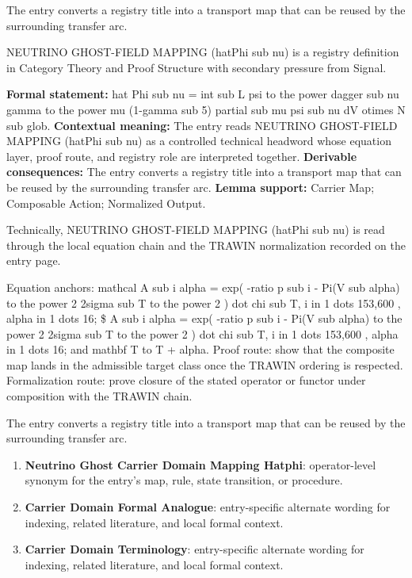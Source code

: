 The entry converts a registry title into a transport map that can be reused by the surrounding transfer arc.
\clearpage


\begingroup\small
{}
NEUTRINO GHOST-FIELD MAPPING (hatPhi sub nu) is a registry definition in Category Theory and Proof Structure with secondary pressure from Signal.

\begingroup\footnotesize\setlength{\emergencystretch}{3em}\sloppy
\textbf{Formal statement:} hat Phi sub nu = int sub L psi to the power dagger sub nu gamma to the power mu (1-gamma sub 5) partial sub mu psi sub nu dV otimes N sub glob. \textbf{Contextual meaning:} The entry reads NEUTRINO GHOST-FIELD MAPPING (hatPhi sub nu) as a controlled technical headword whose equation layer, proof route, and registry role are interpreted together. \textbf{Derivable consequences:} The entry converts a registry title into a transport map that can be reused by the surrounding transfer arc. \textbf{Lemma support:} Carrier Map; Composable Action; Normalized Output.\par
\endgroup

Technically, NEUTRINO GHOST-FIELD MAPPING (hatPhi sub nu) is read through the local equation chain and the TRAWIN normalization recorded on the entry page.

Equation anchors: mathcal A sub i alpha = exp( -ratio p sub i - Pi(V sub alpha) to the power 2 2sigma sub T to the power 2 ) dot chi sub T, i in 1 dots 153,600 , alpha in 1 dots 16; \$ A sub i alpha = exp( -ratio p sub i - Pi(V sub alpha) to the power 2 2sigma sub T to the power 2 ) dot chi sub T, i in 1 dots 153,600 , alpha in 1 dots 16; and mathbf T to T + alpha. Proof route: show that the composite map lands in the admissible target class once the TRAWIN ordering is respected. Formalization route: prove closure of the stated operator or functor under composition with the TRAWIN chain.

The entry converts a registry title into a transport map that can be reused by the surrounding transfer arc.
\endgroup

\begin{enumerate}[leftmargin=1.6em,itemsep=6pt,topsep=4pt]
\item \textbf{Neutrino Ghost Carrier Domain Mapping Hatphi}: operator-level synonym for the entry's map, rule, state transition, or procedure.
\item \textbf{Carrier Domain Formal Analogue}: entry-specific alternate wording for indexing, related literature, and local formal context.
\item \textbf{Carrier Domain Terminology}: entry-specific alternate wording for indexing, related literature, and local formal context.
\end{enumerate}

